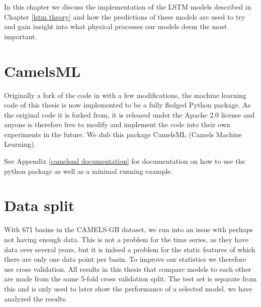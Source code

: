 In this chapter we discuss the implementation of the LSTM models described in Chapter 
\ref{lstm theory} and how the predictions of these models are used to try and gain 
insight into what physical processes our models deem the most important.
\section{CamelsML}
Originally a fork of the code in \citet{lstm_second_paper} with a few modifications, 
the machine learning code of this thesis is now implemented to be a fully fledged 
Python package. As the original code it is forked from, it is released under the 
Apache 2.0 license and anyone is therefore free to modify and implement the code 
into their own experiments in the future.
We dub this package CamelsML (Camels Machine Learning).


See Appendix \ref{camelsml documentation} for documentation on how to use the python 
package as well as a minimal running example.

\section{Data split}
With 671 basins in the CAMELS-GB dataset, we run into an issue with perhaps not 
having enough data. This is not a problem for the time series, as they have data 
over several years, but it is indeed a problem for the static features of which there 
are only one data point per basin. To improve our statistics we therefore use 
cross validation. All results in this thesis that compare models to each other 
are made from the same 5-fold cross validation split. The test set is separate 
from this and is only used to later show the performance of a selected model.
we have analyzed the results.

